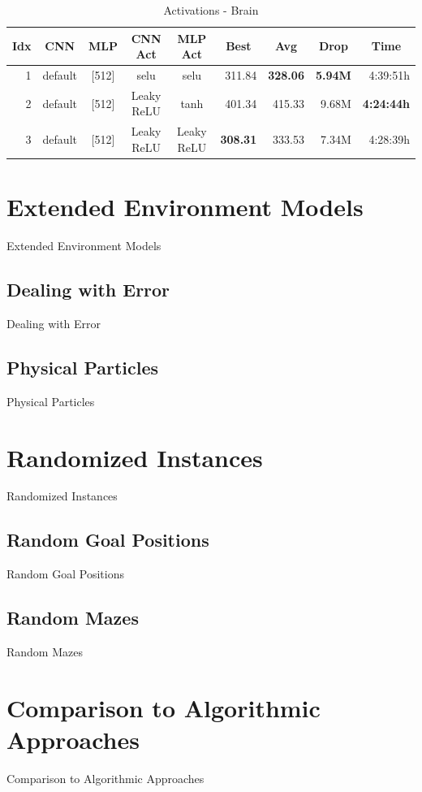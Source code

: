\begin{table}[htp]
    \begin{center}
        \begin{tabular}{rccccrrrr}
            \toprule
            \multicolumn{1}{c}{Idx} & \multicolumn{1}{c}{CNN} & \multicolumn{1}{c}{MLP} & \multicolumn{1}{c}{CNN Act} & \multicolumn{1}{c}{MLP Act} & \multicolumn{1}{c}{Best} & \multicolumn{1}{c}{Avg} & \multicolumn{1}{c}{Drop} & \multicolumn{1}{c}{Time}\\
            \midrule
            1 & default & [512] & selu & selu & 311.84 & \textbf{328.06} & \textbf{5.94M} & 4:39:51h \\
            2 & default & [512] & Leaky ReLU & tanh & 401.34 & 415.33 & 9.68M & \textbf{4:24:44h} \\
            3 & default & [512] & Leaky ReLU & Leaky ReLU & \textbf{308.31} & 333.53 & 7.34M & 4:28:39h \\
            \bottomrule
        \end{tabular}
    \end{center}
    \caption{Activations - Brain}
\end{table}


\section{Extended Environment Models} \label{sec:EvalExtendedModels}
Extended Environment Models
\subsection{Dealing with Error} \label{sec:EvalError}
Dealing with Error
\subsection{Physical Particles} \label{sec:EvalPhysical}
Physical Particles
\section{Randomized Instances} \label{sec:EvalRandomness}
Randomized Instances
\subsection{Random Goal Positions} \label{sec:EvalRandomGoals}
Random Goal Positions
\subsection{Random Mazes} \label{sec:EvalRandomMaze}
Random Mazes
\section{Comparison to Algorithmic Approaches} \label{sec:EvalAlgorithms}
Comparison to Algorithmic Approaches